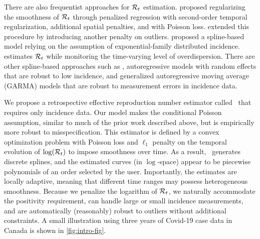 There are also frequentist approaches for $\mathcal{R}_t$ estimation.
\citet{abry2020spatial} proposed regularizing the smoothness of $\mathcal{R}_t$
through penalized
regression with second-order temporal regularization, additional spatial
penalties, and with Poisson loss. \citet{pascal2022nonsmooth}
extended this procedure by introducing another penalty on outliers.
%
\cite{pircalabelu2023spline} proposed a spline-based model relying on the 
assumption of exponential-family distributed incidence. 
\cite{ho2023accounting} estimates $\mathcal{R}_t$ while monitoring the time-varying
level of overdispersion. 
%
There are other spline-based approaches such as
\cite{azmon2014estimation,gressani2021approximate},
autoregressive models with random effects \citep{jin2023epimix} that are robust
to low incidence, and generalized autoregressive moving average (GARMA)
models \citep{hettinger2023estimating} that are robust to measurement errors in
incidence data. 


We propose a retrospective effective reproduction number estimator
called \RtEstim\ that requires only incidence data. Our model makes the
conditional Poisson assumption, similar to much of the prior work described
above, but is empirically more robust to misspecification. This estimator is defined by a
convex optimization problem with Poisson loss and $\ell_1$ penalty on the
temporal evolution of $\log(\mathcal{R}_t)$ to impose smoothness over time. 
As a result, \RtEstim\ generates discrete splines, and the estimated curves (in
$\log$-space) appear to be piecewise polynomials of an order selected by the
user. Importantly, the estimates are locally adaptive, meaning that different
time ranges may possess heterogeneous smoothness. Because we penalize the
logarithm of $\mathcal{R}_t$, we naturally accommodate the positivity requirement, can
handle large or small incidence measurements, and are automatically (reasonably)
robust to outliers without additional constraints. A small illustration using
three years of Covid-19 case data in Canada is shown in \autoref{fig:intro-fig}.

